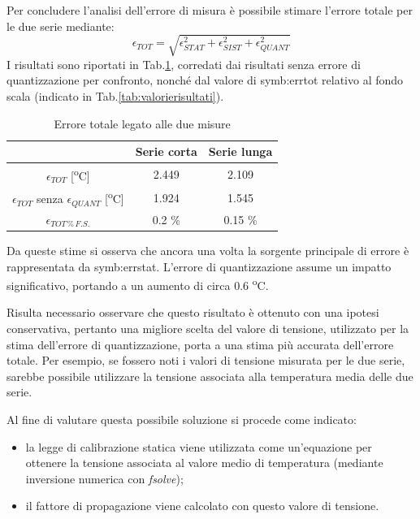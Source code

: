Per concludere l'analisi dell'errore di misura è possibile stimare l'errore totale per le due serie mediante:
\begin{equation}
	\epsilon_{\textit{TOT}}=\sqrt{\epsilon_{\textit{STAT}}^2+\epsilon_{\textit{SIST}}^2+\epsilon_{\textit{QUANT}}^2}
\end{equation}
I risultati sono riportati in Tab.\ref{tab:risultatitot}, corredati dai risultati senza errore di quantizzazione per confronto, nonché dal valore di \gls{symb:errtot} relativo al fondo scala (indicato in Tab.\ref{tab:valorierisultati}).
\begin{table}[H]
	\centering
	\begin{tabular}{c|c|c}
		\toprule
		\toprule
		& \textbf{Serie corta} & \textbf{Serie lunga} \\
		\midrule
		$\epsilon_{\textit{TOT}}$ [\textsuperscript{o}C] & 2.449 & 2.109 \\
		\midrule
		$\epsilon_{\textit{TOT}}$ senza $\epsilon_{\textit{QUANT}}$ [\textsuperscript{o}C] & 1.924 & 1.545 \\
		\midrule
		$\epsilon_{\textit{TOT}\, \% \, F.S.}$ & 0.2 \% & 0.15 \% \\
		\bottomrule
		\bottomrule
	\end{tabular}
	\caption{Errore totale legato alle due misure}
	\label{tab:risultatitot}
\end{table}
Da queste stime si osserva che ancora una volta la sorgente principale di errore è rappresentata da \gls{symb:errstat}. L'errore di quantizzazione assume un impatto significativo, portando a un aumento di circa 0.6 \textsuperscript{o}C.

Risulta necessario osservare che questo risultato è ottenuto con una ipotesi conservativa, pertanto una migliore scelta del valore di tensione, utilizzato per la stima dell'errore di quantizzazione, porta a una stima più accurata dell'errore totale. Per esempio, se fossero noti i valori di tensione misurata per le due serie, sarebbe possibile utilizzare la tensione associata alla temperatura media delle due serie.

Al fine di valutare questa possibile soluzione si procede come indicato:
\begin{itemize}
	\item la legge di calibrazione statica viene utilizzata come un'equazione per ottenere la tensione associata al valore medio di temperatura (mediante inversione numerica con \textit{fsolve});
	\item il fattore di propagazione viene calcolato con questo valore di tensione. 
\end{itemize} 


